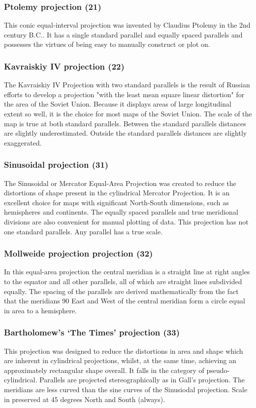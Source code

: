 \documentclass[titlepage,a4paper]{article}
\begin{document}
\subsubsection*{Ptolemy projection (21)}
This conic equal-interval projection was invented by Claudius Ptolemy in
the 2nd century B.C.. It has a single standard parallel and equally spaced
parallels and possesses the virtues of being easy to manually construct or
plot on.

\subsubsection*{Kavraiskiy IV projection (22)}
The Kavraiskiy IV Projection with two standard parallels is the result of
Russian efforts to develop a projection "with the least mean square linear
distortion" for the area of the Soviet Union. Because it displays areas of
large longitudinal extent so well, it is the choice for most maps of the
Soviet Union. The scale of the map is true at both standard parallels. Between
the standard parallels distances are slightly underestimated. Outside the
standard parallels distances are slightly exaggerated.

\subsubsection*{Sinusoidal projection (31)}
The Sinusoidal or Mercator Equal-Area Projection was created to reduce the
distortions of shape present in the cylindrical Mercator Projection. It is
an excellent choice for maps with significant North-South dimensions, such
as hemispheres and continents. The equally spaced parallels and true meridional
divisions are also convenient for manual plotting of data. This projection has
not one standard parallels. Any parallel has a true scale.

\subsubsection*{Mollweide projection projection (32)}
In this equal-area projection the central meridian is a straight line at right
angles to the equator and all other parallels, all of which are straight lines
subdivided equally. The spacing of the parallels are derived mathematically
from the fact that the meridians 90 East and West of the central meridian form
a circle equal in area to a hemisphere.
       
\subsubsection*{Bartholomew's `The Times' projection (33)}
This projection was designed to reduce the distortions in area and shape which
are inherent in cylindrical projections, whilst, at the same time, achieving
an approximately rectangular shape overall. It falls in the category of
pseudo-cylindrical. Parallels are projected stereographically as in Gall's
projection. The meridians are less curved than the sine curves of the
Sinusiodal projection. Scale in preserved at 45 degrees North and South
(always).
\end{document}
